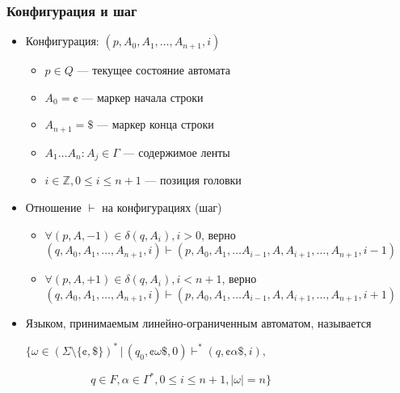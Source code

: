 \documentclass{beamer}
\begin{document}
\begin{frame}[fragile]
  \transwipe[direction=90]
  \frametitle{Конфигурация и шаг}
\begin{itemize}
  \item Конфигурация: $(p, A_0, A_1, \dots, A_{n+1}, i)$
  \begin{itemize}
  	\item $p \in Q$ --- текущее состояние автомата
  	\item $A_0 = \cent$ --- маркер начала строки
  	\item $A_{n+1} = \$ $ --- маркер конца строки
  	\item $A_1 \dots A_n: A_j \in \Gamma$ --- содержимое ленты
  	\item $i \in \mathds{Z}, 0 \leq i \leq n+1$ --- позиция головки
  \end{itemize}
  \item Отношение $\vdash$ на конфигурациях (шаг)
  \begin{itemize}
  	\item $\forall (p, A, -1) \in \delta(q, A_i), i > 0$, верно $(q, A_0, A_1, \dots, A_{n+1}, i) \vdash (p, A_0, A_1, \dots A_{i-1}, A, A_{i+1}, \dots, A_{n+1}, i - 1)$
  	\item $\forall (p, A, +1) \in \delta(q, A_i), i < n+1$, верно $(q, A_0, A_1, \dots, A_{n+1}, i) \vdash (p, A_0, A_1, \dots A_{i-1}, A, A_{i+1}, \dots, A_{n+1}, i + 1)$
  \end{itemize}
  \item Языком, принимаемым линейно-ограниченным автоматом, называется

  $\{ \omega \in (\Sigma \setminus \{ \cent, \$ \})^* \, | \, (q_0, \cent \omega \$, 0) \vdash^* (q, \cent \alpha \$, i), $

  $\ \ \ \ \ \ \ \ \ \ \ \ \ \ \ \ \ \ \ \ \ \ \ \ \ \ q \in F, \alpha \in \Gamma^*, 0 \leq i \leq n+1, |\omega| = n \}$
\end{itemize}

\end{frame}
\end{document}
